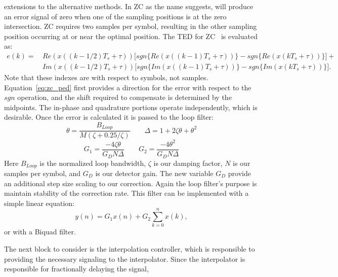 \documentclass[letterpaper,12pt]{article}
\begin{document}
extensions to the alternative methods. In ZC as the name suggests, will produce an error signal of zero when 
one of the sampling positions is at the zero intersection.  ZC requires two samples per symbol, resulting in 
the other sampling position occurring at or near the optimal position.  The TED for ZC~\cite{mengali1997synchronization} is 
evaluated as:
%
\begin{equation}\label{eq:zc_ped}
\begin{split}
  e(k) =\, & Re( x((k-1/2)T_s + \tau ) )\big[sgn\{Re(x((k-1)T_s + \tau ))\} - sgn\{Re(x(kT_s + \tau 
))\}\big] + \\
  &Im( x((k-1/2)T_s + \tau ) )\big[sgn\{Im(x((k-1)T_s + \tau ))\} - sgn\{Im(x(kT_s + \tau ))\}\big].
\end{split}
\end{equation}
%
Note that these indexes are with respect to symbols, not samples.  Equation~\eqref{eq:zc_ped} first provides 
a direction for the error with respect to the $sgn$ operation, and the shift required to compensate is 
determined by the midpoints.  The in-phase and quadrature portions operate independently, which is 
desirable. Once the error is calculated it is passed to the loop filter:%
\begin{equation}
  \theta = \frac{B_{Loop}}{M(\zeta + 0.25/\zeta)} \quad \quad \Delta = 1 + 2\zeta\theta + \theta^2
\end{equation}
\begin{equation}
  G_1 = \frac{-4\zeta\theta}{G_D N\Delta} \quad \quad G_2 = \frac{-4\theta^2}{G_D N\Delta}
\end{equation}
%
Here $B_{Loop}$ is the normalized loop bandwidth, $\zeta$ is our damping factor, $N$ is our samples per symbol, and $G_D$ is our detector gain.  The new variable $G_D$ provide an additional step size scaling to our correction.  Again the loop filter's purpose is maintain stability of the correction rate.  This filter can be implemented with a simple linear equation:
\begin{equation}
	y(n) = G_1x(n) + G_2 \sum_{k=0}^{n}x(k),
\end{equation}
or with a Biquad filter.
\par
%
The next block to consider is the interpolation controller, which is responsible to providing the necessary 
signaling to the interpolator.  Since the interpolator is responsible for fractionally delaying the signal, 
\end{document}
